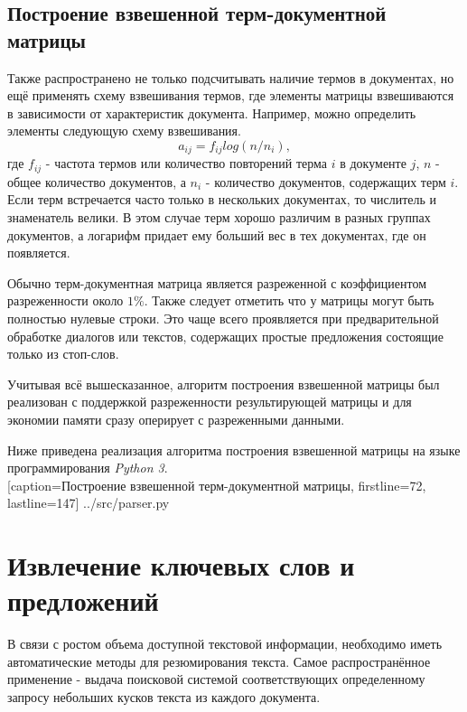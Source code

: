 \subsection{Построение взвешенной терм-документной матрицы}

Также распространено не только подсчитывать наличие термов в документах,
но ещё применять схему взвешивания термов, где элементы матрицы взвешиваются в зависимости от характеристик документа.
Например, можно определить элементы следующую схему взвешивания.
\begin{equation}
  a_{ij} = f_{ij} log(n /n_i),
\end{equation}
где $f_{ij}$ - частота термов или количество повторений терма $i$ в документе $j$, $n$ - общее количество документов,  а $n_i$ - количество документов, содержащих терм $i$.
Если терм встречается часто только в нескольких документах, то числитель и знаменатель велики.
В этом случае терм хорошо различим в разных группах документов, а логарифм придает ему больший вес в тех документах, где он появляется.

Обычно терм-документная матрица является разреженной с коэффициентом разреженности около $1\%$.
Также следует отметить что у матрицы могут быть полностью нулевые строки.
Это чаще всего проявляется при предварительной обработке диалогов или текстов,
содержащих простые предложения состоящие только из стоп-слов.

Учитывая всё вышесказанное, алгоритм построения взвешенной матрицы
был реализован с поддержкой разреженности результирующей матрицы
и для экономии памяти сразу оперирует с разреженными данными.

\newpage

Ниже приведена реализация алгоритма построения взвешенной матрицы на языке программирования \textit{Python 3}.
\\


  [caption=Построение взвешенной терм-документной матрицы, firstline=72, lastline=147]
  {../src/parser.py}




\newpage




\section{Извлечение ключевых слов и предложений}

В связи с ростом объема доступной текстовой информации, необходимо иметь автоматические методы для резюмирования текста.
Самое распространённое применение - выдача поисковой системой соответствующих определенному запросу небольших кусков текста из каждого документа.

